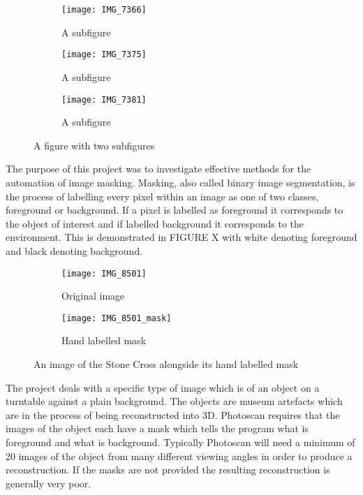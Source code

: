 \documentclass[12pt]{IIBproject}
\begin{document}
\begin{figure}[H]
\centering
\begin{subfigure}{.33\textwidth}
  \centering
  \texttt{[image: IMG\_7366]}
  \caption{A subfigure}
  \label{fig:sub1}
\end{subfigure}%
\begin{subfigure}{.33\textwidth}
  \centering
  \texttt{[image: IMG\_7375]}
  \caption{A subfigure}
  \label{fig:sub2}
\end{subfigure}
\begin{subfigure}{.33\textwidth}
  \centering
  \texttt{[image: IMG\_7381]}
  \caption{A subfigure}
  \label{fig:sub2}
\end{subfigure}
\caption{A figure with two subfigures}
\label{fig:test}
\end{figure}
The purpose of this project was to investigate effective methods for the automation of image masking. Masking, also called binary image segmentation, is the process of labelling every pixel within an image as one of two classes, foreground or background. If a pixel is labelled as foreground it corresponds to the object of interest and if labelled background it corresponds to the environment. This is demonstrated in FIGURE X with white denoting foreground and black denoting background. 
\begin{figure}[H]
\centering
\begin{subfigure}{.5\textwidth}
  \centering
  \texttt{[image: IMG\_8501]}
  \caption{Original image}
  \label{fig:sub1}
\end{subfigure}%
\begin{subfigure}{.5\textwidth}
  \centering
  \texttt{[image: IMG\_8501\_mask]}
  \caption{Hand labelled mask}
  \label{fig:sub2}
\end{subfigure}
\caption{An image of the Stone Cross alongside its hand labelled mask}
\label{fig:test}
\end{figure}
The project deals with a specific type of image which is of an object on a turntable against a plain background. The objects are museum artefacts which are in the process of being reconstructed into 3D. Photoscan requires that the images of the object each have a mask which tells the program what is foreground and what is background. Typically Photoscan will need a minimum of 20 images of the object from many different viewing angles in order to produce a reconstruction. If the masks are not provided the resulting reconstruction is generally very poor\cite{photoscanManual}. 
\end{document}
